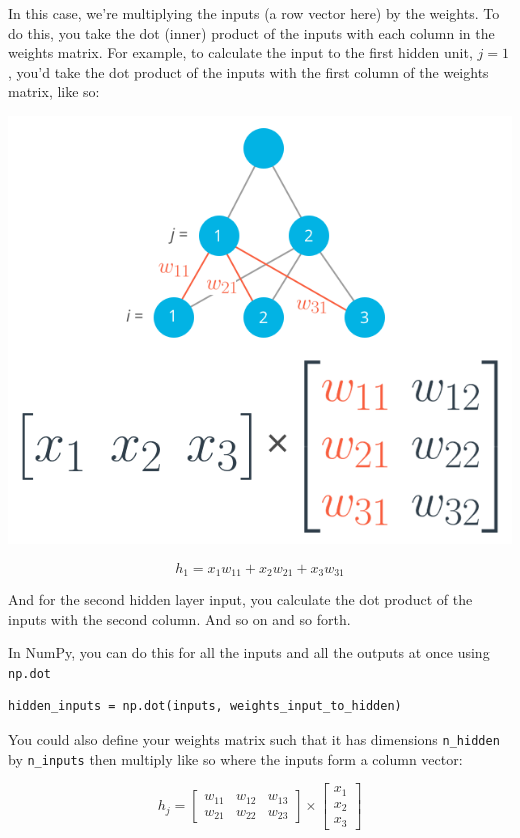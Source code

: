 In this case, we're multiplying the inputs (a row vector here) by the weights. To do this, you take the dot (inner) product of the inputs with each column in the weights matrix. For example, to calculate the input to the first hidden unit, \(j = 1\), you'd take the dot product of the inputs with the first column of the weights matrix, like so:

\includegraphics[width=0.75\linewidth]{img//intro//input-times-weights.png}

\[h_1 = x_1 w_{11} + x_2 w_{21} + x_3 w_{31}\]

And for the second hidden layer input, you calculate the dot product of the inputs with the second column. And so on and so forth. \newline

In NumPy, you can do this for all the inputs and all the outputs at once using \lstinline{np.dot}

\begin{lstlisting}
hidden_inputs = np.dot(inputs, weights_input_to_hidden)
\end{lstlisting}

You could also define your weights matrix such that it has dimensions \lstinline{n_hidden} by \lstinline{n_inputs} then multiply like so where the inputs form a column vector:

\[h_j =
\begin{bmatrix}
w_{11} & w_{12} & w_{13} \\
w_{21} & w_{22} & w_{23}
\end{bmatrix}
\times
\begin{bmatrix}
x_1 \\
x_2 \\
x_3
\end{bmatrix}
\]

